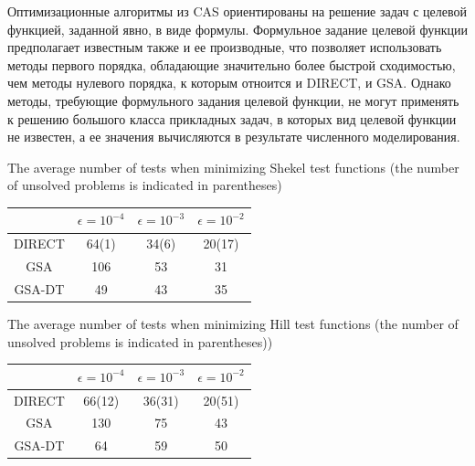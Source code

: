 \documentclass[entropy,article,submit,moreauthors,pdftex]{Definitions/mdpi}
\begin{document}
Оптимизационные алгоритмы из CAS ориентированы на решение задач с целевой функцией, заданной явно, в виде формулы.
Формульное задание целевой функции предполагает известным также и ее производные, что позволяет использовать методы первого порядка, обладающие значительно более быстрой сходимостью, чем методы нулевого порядка, к которым отноится и DIRECT, и GSA.
Однако методы, требующие формульного задания целевой функции, не могут применять к решению большого класса прикладных задач, в которых вид целевой функции не известен, а ее значения вычисляются в результате численного моделирования. 



\begin{specialtable}[H] 
	\caption{The average number of tests when minimizing Shekel test functions (the number of unsolved problems is indicated in parentheses)}\label{table:average_Shekel}
	\center
\begin{tabular}{cccc}
\toprule
        & \textbf{$\epsilon = 10^{-4}$} & \textbf{$\epsilon = 10^{-3}$} & \textbf{$\epsilon = 10^{-2}$} \\
\midrule													
DIRECT         & 64(1) &  34(6)   & 20(17)    \\
GSA            & 106  & 53  &  31   \\ 
GSA-DT         & 49   & 43  &  35   \\

\bottomrule
\end{tabular}
\end{specialtable}

\begin{specialtable}[H] 
	\caption{The average number of tests when minimizing Hill test functions (the number of unsolved problems is indicated in parentheses))}\label{table:average_Hill}
	\center
\begin{tabular}{cccc}
\toprule
        & \textbf{$\epsilon = 10^{-4}$} & \textbf{$\epsilon = 10^{-3}$} & \textbf{$\epsilon = 10^{-2}$} \\
\midrule					  
DIRECT                & 66(12) & 36(31)  & 20(51)  \\
GSA                   & 130    & 75      & 43      \\
GSA-DT                & 64     & 59      & 50      \\
\bottomrule
\end{tabular}
\end{specialtable}
\end{document}

